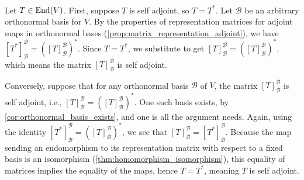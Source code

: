 \begin{exercisesolution}
\label{sol:self_adjoint_matrix_criterion} ~\\
Let $T \in \operatorname{End}(V)$.
First, suppose $T$ is self adjoint, so $T = T^*$. Let $\mathcal{B}$ be an arbitrary orthonormal basis for $V$. By the properties of representation matrices for adjoint maps in orthonormal bases (\cref{prop:matrix_representation_adjoint}), we have $[T^*]_{\mathcal{B}}^{\mathcal{B}} = \left([T]_{\mathcal{B}}^{\mathcal{B}}\right)^*$. Since $T = T^*$, we substitute to get $[T]_{\mathcal{B}}^{\mathcal{B}} = \left([T]_{\mathcal{B}}^{\mathcal{B}}\right)^*$, which means the matrix $[T]_{\mathcal{B}}^{\mathcal{B}}$ is self adjoint.

Conversely, suppose that for any orthonormal basis $\mathcal{B}$ of $V$, the matrix $[T]_{\mathcal{B}}^{\mathcal{B}}$ is self adjoint, i.e., $[T]_{\mathcal{B}}^{\mathcal{B}} = \left([T]_{\mathcal{B}}^{\mathcal{B}}\right)^*$. One such basis exists, by \cref{cor:orthonormal_basis_exists}, and one is all the argument needs. Again, using the identity $[T^*]_{\mathcal{B}}^{\mathcal{B}} = \left([T]_{\mathcal{B}}^{\mathcal{B}}\right)^*$, we see that $[T]_{\mathcal{B}}^{\mathcal{B}} = [T^*]_{\mathcal{B}}^{\mathcal{B}}$. Because the map sending an endomorphism to its representation matrix with respect to a fixed basis is an isomorphism (\cref{thm:homomorphism_isomorphism}), this equality of matrices implies the equality of the maps, hence $T = T^*$, meaning $T$ is self adjoint.
\end{exercisesolution}

